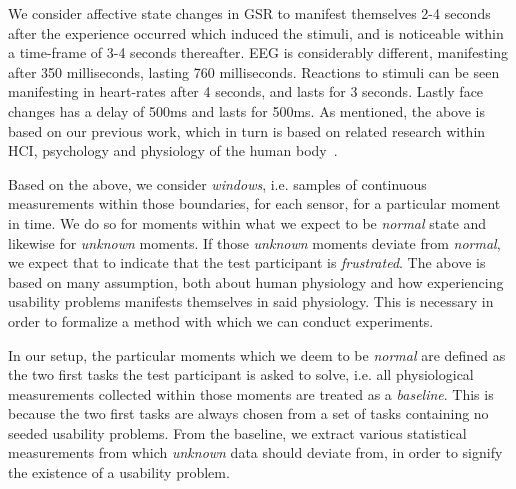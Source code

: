 We consider affective state changes in GSR to manifest themselves 2-4 seconds after the experience occurred which
induced the stimuli, and is noticeable within a time-frame of 3-4 seconds thereafter. EEG is considerably different,
manifesting after 350 milliseconds, lasting 760 milliseconds. Reactions to stimuli can be seen manifesting in heart-rates
after 4 seconds, and lasts for 3 seconds. Lastly face changes has a delay of 500ms and lasts for 500ms. As mentioned,
the above is based on our previous work, which in turn is based on related research within HCI, psychology and
physiology of the human body~\cite{9th_semester_project}.

Based on the above, we consider \textit{windows}, i.e. samples of continuous measurements within those boundaries, for
each sensor, for a particular moment in time. We do so for moments within what we expect to be \textit{normal} state and
likewise for \textit{unknown} moments. If those \textit{unknown} moments deviate from \textit{normal}, we expect that to
indicate that the test participant is \textit{frustrated}. The above is based on many assumption, both about human
physiology and how experiencing usability problems manifests themselves in said physiology. This is necessary in order
to formalize a method with which we can conduct experiments.

In our setup, the particular moments which we deem to be \textit{normal} are defined as the two first tasks the test
participant is asked to solve, i.e. all physiological measurements collected within those moments are treated as a
\textit{baseline}. This is because the two first tasks are always chosen from a set of tasks containing no seeded
usability problems. From the baseline, we extract various statistical measurements from which \textit{unknown} data
should deviate from, in order to signify the existence of a usability problem.